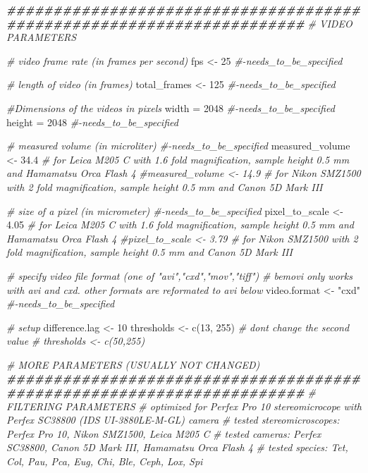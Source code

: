 \documentclass[
]{article}
\newenvironment{Shaded}{\begin{snugshade}}{\end{snugshade}}
\newcommand{\CommentTok}[1]{\textcolor[rgb]{0.56,0.35,0.01}{\textit{#1}}}
\newcommand{\DecValTok}[1]{\textcolor[rgb]{0.00,0.00,0.81}{#1}}
\newcommand{\DocumentationTok}[1]{\textcolor[rgb]{0.56,0.35,0.01}{\textbf{\textit{#1}}}}
\newcommand{\FloatTok}[1]{\textcolor[rgb]{0.00,0.00,0.81}{#1}}
\newcommand{\FunctionTok}[1]{\textcolor[rgb]{0.00,0.00,0.00}{#1}}
\newcommand{\NormalTok}[1]{#1}
\newcommand{\OtherTok}[1]{\textcolor[rgb]{0.56,0.35,0.01}{#1}}
\newcommand{\StringTok}[1]{\textcolor[rgb]{0.31,0.60,0.02}{#1}}
\begin{document}
\begin{Shaded}
\begin{Highlighting}[]
\DocumentationTok{\#\#\#\#\#\#\#\#\#\#\#\#\#\#\#\#\#\#\#\#\#\#\#\#\#\#\#\#\#\#\#\#\#\#\#\#\#\#\#\#\#\#\#\#\#\#\#\#\#\#\#\#\#\#\#\#\#\#\#\#\#\#\#\#\#\#\#\#\#\#}
\CommentTok{\# VIDEO PARAMETERS}

\CommentTok{\# video frame rate (in frames per second)}
\NormalTok{fps }\OtherTok{\textless{}{-}} \DecValTok{25} \CommentTok{\#{-}needs\_to\_be\_specified}

\CommentTok{\# length of video (in frames)}
\NormalTok{total\_frames }\OtherTok{\textless{}{-}} \DecValTok{125} \CommentTok{\#{-}needs\_to\_be\_specified}

\CommentTok{\#Dimensions of the videos in pixels}
\NormalTok{width }\OtherTok{=} \DecValTok{2048} \CommentTok{\#{-}needs\_to\_be\_specified}
\NormalTok{height }\OtherTok{=} \DecValTok{2048} \CommentTok{\#{-}needs\_to\_be\_specified}

\CommentTok{\# measured volume (in microliter) \#{-}needs\_to\_be\_specified}
\NormalTok{measured\_volume }\OtherTok{\textless{}{-}}
  \FloatTok{34.4} \CommentTok{\# for Leica M205 C with 1.6 fold magnification, sample height 0.5 mm and Hamamatsu Orca Flash 4}
\CommentTok{\#measured\_volume \textless{}{-} 14.9 \# for Nikon SMZ1500 with 2 fold magnification, sample height 0.5 mm and Canon 5D Mark III}

\CommentTok{\# size of a pixel (in micrometer) \#{-}needs\_to\_be\_specified}
\NormalTok{pixel\_to\_scale }\OtherTok{\textless{}{-}}
  \FloatTok{4.05} \CommentTok{\# for Leica M205 C with 1.6 fold magnification, sample height 0.5 mm and Hamamatsu Orca Flash 4}
\CommentTok{\#pixel\_to\_scale \textless{}{-} 3.79 \# for Nikon SMZ1500 with 2 fold magnification, sample height 0.5 mm and Canon 5D Mark III}

\CommentTok{\# specify video file format (one of "avi","cxd","mov","tiff")}
\CommentTok{\# bemovi only works with avi and cxd. other formats are reformated to avi below}
\NormalTok{video.format }\OtherTok{\textless{}{-}} \StringTok{"cxd"} \CommentTok{\#{-}needs\_to\_be\_specified}

\CommentTok{\# setup}
\NormalTok{difference.lag }\OtherTok{\textless{}{-}} \DecValTok{10}
\NormalTok{thresholds }\OtherTok{\textless{}{-}} \FunctionTok{c}\NormalTok{(}\DecValTok{13}\NormalTok{, }\DecValTok{255}\NormalTok{) }\CommentTok{\# don\textquotesingle{}t change the second value}
\CommentTok{\# thresholds \textless{}{-} c(50,255)}

\CommentTok{\# MORE PARAMETERS (USUALLY NOT CHANGED)}
\DocumentationTok{\#\#\#\#\#\#\#\#\#\#\#\#\#\#\#\#\#\#\#\#\#\#\#\#\#\#\#\#\#\#\#\#\#\#\#\#\#\#\#\#\#\#\#\#\#\#\#\#\#\#\#\#\#\#\#\#\#\#\#\#\#\#\#\#\#\#\#\#\#\#}
\CommentTok{\# FILTERING PARAMETERS}
\CommentTok{\# optimized for Perfex Pro 10 stereomicrocope with Perfex SC38800 (IDS UI{-}3880LE{-}M{-}GL) camera}
\CommentTok{\# tested stereomicroscopes: Perfex Pro 10, Nikon SMZ1500, Leica M205 C}
\CommentTok{\# tested cameras: Perfex SC38800, Canon 5D Mark III, Hamamatsu Orca Flash 4}
\CommentTok{\# tested species: Tet, Col, Pau, Pca, Eug, Chi, Ble, Ceph, Lox, Spi}


\end{Highlighting}
\end{Shaded}
\end{document}

